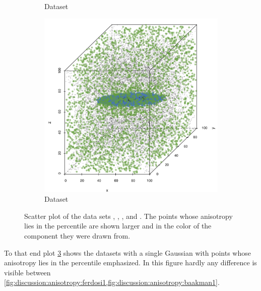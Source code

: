 \begin{figure}
\begin{subfigure}{0.23\textwidth}
				\caption{Dataset \baakmanFour}
				\label{fig:discussion:anisotropy:baakman4}
			\end{subfigure}		
			\begin{subfigure}{0.23\textwidth}
				\centering
				\includegraphics[keepaspectratio=true, width=\textwidth, height=0.23\textheight]{discussion/img/baakman_5_60000_anisotropy.png}
				\caption{Dataset \baakmanFive}
				\label{fig:discussion:anisotropy:baakman5}
			\end{subfigure}			
			\caption{Scatter plot of the data sets
				 \ferdosiOne, %
				 \baakmanOne, %
				 \baakmanFour, and %
				 \baakmanFive. %
				The points whose anisotropy lies in the  percentile are shown larger and in the color of the component they were drawn from.}
			\label{fig:discussion:anisotropy:singleSphere}
		\end{figure}
		To that end plot \cref{fig:discussion:anisotropy:singleSphere} shows the datasets with a single Gaussian with points whose anisotropy lies in the  percentile emphasized. 
			In this figure hardly any difference is visible between \cref{fig:discussion:anisotropy:ferdosi1,fig:discussion:anisotropy:baakman1}. 
